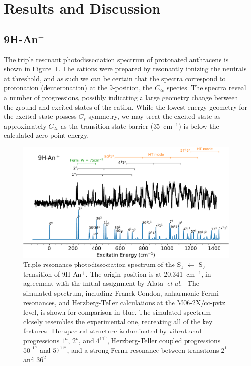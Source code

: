 \documentclass[journal=jpcafh,manuscript=article,layout=onecolumn, 12pt]{achemso}
\begin{document}
\section{Results and Discussion}
\subsection{9H-An$^+$}
The triple resonant photodissociation spectrum of protonated anthracene is shown in Figure~\ref{Fig:4}. The cations were prepared by resonantly ionizing the neutrals at threshold, and as such we can be certain that the spectra correspond to protonation (deuteronation) at the 9-position, the $C_{2v}$ species. The spectra reveal a number of progressions, possibly indicating a large geometry change between the ground and excited states of the cation. While the lowest energy geometry for the excited state possess $C_s$ symmetry, we may treat the excited state as approximately $C_{2v}$ as the transition state barrier (35~cm$^{-1}$) is below the calculated zero point energy.  

\begin{figure} [h]
	\includegraphics[width=1\textwidth]{figures/9H-An+sw}
	\caption{Triple resonance photodissociation spectrum of the S$_1$ $\leftarrow$ S$_0$  transition of 9H-An$^+$. The origin position is at 20,341~cm$^{-1}$, in agreement with the initial assignment by Alata~\emph{et al.}~\cite{ala10} The simulated spectrum, including Franck-Condon, anharmonic Fermi resonances, and Herzberg-Teller calculations at the M06-2X/cc-pvtz level, is shown for comparison in blue. The simulated spectrum closely resembles the experimental one, recreating all of the key features. The spectral structure is dominated by vibrational progressions $1^n$, $2^n$, and $4^11^n$, Herzberg-Teller coupled progressions $50^11^n$ and $57^11^n$, and a strong Fermi resonance between transitions $2^1$ and $36^2$. }
	\label{Fig:4}
\end{figure}
\end{document}
